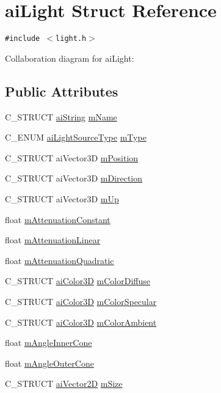 \hypertarget{structai_light}{
\section{aiLight Struct Reference}
\label{structai_light}
}
{\tt \#include $<$light.h$>$}

Collaboration diagram for aiLight:\subsection*{Public Attributes}
\begin{CompactItemize}
\item 
C\_\-STRUCT \hyperlink{structai_string}{aiString} \hyperlink{structai_light_92806413f16230728b04e5f379fd00c0}{mName}
\item 
C\_\-ENUM \hyperlink{light_8h_7a75cb224d903e71e8daede432449766}{aiLightSourceType} \hyperlink{structai_light_4cba1741875dd92724ff55be91c60c2b}{mType}
\item 
C\_\-STRUCT aiVector3D \hyperlink{structai_light_5daf9c9ad2613603b847a527123611f0}{mPosition}
\item 
C\_\-STRUCT aiVector3D \hyperlink{structai_light_f3776d5e4e6065cb6dd7e10dc656dada}{mDirection}
\item 
C\_\-STRUCT aiVector3D \hyperlink{structai_light_c6d03040085bf88979bc55e19ff3a7d6}{mUp}
\item 
float \hyperlink{structai_light_e8804b3c309527ca0f85d676bab55710}{mAttenuationConstant}
\item 
float \hyperlink{structai_light_efda311eaa785ea345782dfa95be817c}{mAttenuationLinear}
\item 
float \hyperlink{structai_light_b4fb07bfa40a807661b1ed1791838a6d}{mAttenuationQuadratic}
\item 
C\_\-STRUCT \hyperlink{structai_color3_d}{aiColor3D} \hyperlink{structai_light_22e7feebbfaf53adf73bd9f581636efd}{mColorDiffuse}
\item 
C\_\-STRUCT \hyperlink{structai_color3_d}{aiColor3D} \hyperlink{structai_light_a79ae6ad6a10f0cb9c740e23b6bb01bf}{mColorSpecular}
\item 
C\_\-STRUCT \hyperlink{structai_color3_d}{aiColor3D} \hyperlink{structai_light_5188b60e6fbaf1635fa780913508e3cd}{mColorAmbient}
\item 
float \hyperlink{structai_light_bad0466811938623e98bf1d334143f9a}{mAngleInnerCone}
\item 
float \hyperlink{structai_light_20fd332a5f9d8e8cb94816ff2b0ae7f4}{mAngleOuterCone}
\item 
C\_\-STRUCT \hyperlink{structai_vector2_d}{aiVector2D} \hyperlink{structai_light_e2494aac85acce5e4fa3920b92b9d7b5}{mSize}
\end{CompactItemize}


